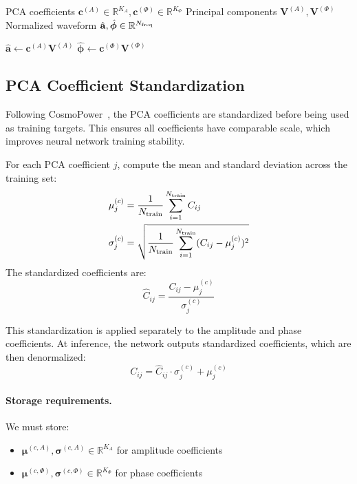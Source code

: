 \documentclass[11pt,a4paper]{article}
\begin{document}
\begin{algorithm}[H]
\caption{PCA Reconstruction (Inference)}
\label{alg:pca_infer}
\begin{algorithmic}[1]
\Require PCA coefficients $\mathbf{c}^{(A)} \in \mathbb{R}^{K_A}, \mathbf{c}^{(\Phi)} \in \mathbb{R}^{K_\Phi}$
\Require Principal components $\mathbf{V}^{(A)}, \mathbf{V}^{(\Phi)}$
\Ensure Normalized waveform $\hat{\mathbf{a}}, \hat{\bm{\phi}} \in \mathbb{R}^{N_{\rm freq}}$

\State $\hat{\mathbf{a}} \gets \mathbf{c}^{(A)} \mathbf{V}^{(A)}$ 
\State $\hat{\bm{\phi}} \gets \mathbf{c}^{(\Phi)} \mathbf{V}^{(\Phi)}$
\end{algorithmic}
\end{algorithm}

\subsection{PCA Coefficient Standardization}
\label{sec:pca_coeff_std}

Following CosmoPower~\cite{cosmopower}, the PCA coefficients are standardized before being used as training targets. This ensures all coefficients have comparable scale, which improves neural network training stability.

For each PCA coefficient $j$, compute the mean and standard deviation across the training set:
\begin{align}
    \mu^{(c)}_j &= \frac{1}{N_{\rm train}} \sum_{i=1}^{N_{\rm train}} C_{ij} \\
    \sigma^{(c)}_j &= \sqrt{\frac{1}{N_{\rm train}} \sum_{i=1}^{N_{\rm train}} (C_{ij} - \mu^{(c)}_j)^2}
\end{align}
The standardized coefficients are:
\begin{equation}
    \hat{C}_{ij} = \frac{C_{ij} - \mu^{(c)}_j}{\sigma^{(c)}_j}
\end{equation}

This standardization is applied separately to the amplitude and phase coefficients. At inference, the network outputs standardized coefficients, which are then denormalized:
\begin{equation}
    C_{ij} = \hat{C}_{ij} \cdot \sigma^{(c)}_j + \mu^{(c)}_j
\end{equation}

\paragraph{Storage requirements.}
We must store:
\begin{itemize}
    \item $\bm{\mu}^{(c,A)}, \bm{\sigma}^{(c,A)} \in \mathbb{R}^{K_A}$ for amplitude coefficients
    \item $\bm{\mu}^{(c,\Phi)}, \bm{\sigma}^{(c,\Phi)} \in \mathbb{R}^{K_\Phi}$ for phase coefficients
\end{itemize}
\end{document}
